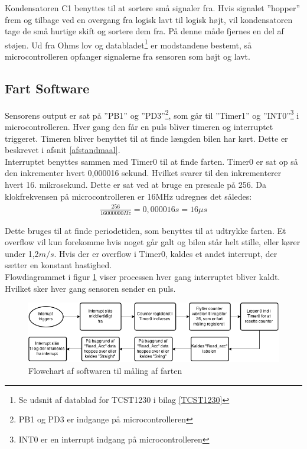 Kondensatoren C1 benyttes til at sortere små signaler fra. Hvis signalet ”hopper” frem og tilbage ved en overgang fra logisk lavt til logisk højt, vil kondensatoren tage de små hurtige skift og sortere dem fra. På denne måde fjernes en del af støjen.  
Ud fra Ohms lov og databladet\footnote{Se udsnit af datablad for TCST1230 i bilag \ref{TCST1230}} er modstandene bestemt, så microcontrolleren opfanger signalerne fra sensoren som højt og lavt. \\


\subsection{Fart Software}
\label{fartmål_software}
Sensorens output er sat på ”PB1” og ”PD3”\footnote{PB1 og PD3 er indgange på microcontrolleren}, som går til ”Timer1” og ”INT0”\footnote{INT0 er en interrupt indgang på microcontrolleren} i microcontrolleren. Hver gang den får en puls  bliver timeren og interruptet triggeret. Timeren bliver benyttet til at finde længden bilen har kørt. Dette er beskrevet i afsnit \ref{afstandmaal}. \\

Interruptet benyttes sammen med Timer0 til at finde farten. Timer0 er sat op så den inkrementer hvert 0,000016 sekund. Hvilket svarer til den inkrementerer hvert 16. mikrosekund. Dette er sat ved at bruge en prescale på 256. Da klokfrekvensen på microcontrolleren er 16MHz udregnes det således:
\begin{align*}
\frac{256}{16 000 000Hz} = 0,000016 s = 16 \mu s 
\end{align*}

Dette bruges til at finde periodetiden, som benyttes til at udtrykke farten. Et overflow vil kun forekomme hvis noget går galt og bilen står helt stille, eller kører under 1,2\(m/s\). Hvis der er overflow i Timer0, kaldes et andet interrupt, der sætter en konstant hastighed. \\

Flowdiagrammet i figur \ref{fart_chart} viser processen hver gang interruptet bliver kaldt. Hvilket sker hver gang sensoren sender en puls. \\

\begin{figure}[h!]
\center
\includegraphics[scale=0.65]{./Graphics/fart_chart}
\caption{Flowchart af softwaren til måling af farten}
\label{fart_chart}
\end{figure}

